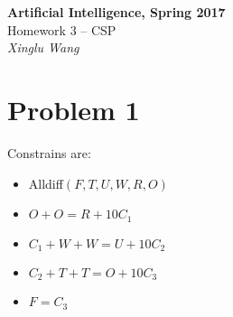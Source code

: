 \documentclass{mcmthesis}
\begin{document}
\begin{center}
	\textbf{\LARGE{Artificial Intelligence, Spring 2017}} \\
	\vspace{0.2em}
	\large{Homework 3 -- CSP} \\
	\vspace{1em}
	{\itshape Xinglu Wang}  
\end{center}
\section{Problem 1}
Constrains are:
\begin{itemize}[noitemsep]
	\item Alldiff$(F,T,U,W,R,O)$
	\item $O+O=R+10C_1$
	\item $C_1+W+W=U+10C_2$
	\item $C_2+T+T=O+10C_3$
	\item $F=C_3$
\end{itemize}
\end{document}
